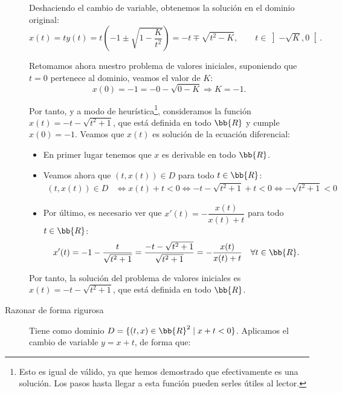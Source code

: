 \documentclass[12pt]{article}
\begin{document}
\begin{ejercicio}
\begin{description}
        Deshaciendo el cambio de variable, obtenemos la solución en el dominio original:
        \begin{equation*}
            x(t)=ty(t)=t\left(-1\pm\sqrt{1-\dfrac{K}{t^2}}\right)=-t\mp\sqrt{t^2-K},\qquad t\in \left]-\sqrt{K},0\right[.
        \end{equation*}

        Retomamos ahora nuestro problema de valores iniciales, suponiendo que $t=0$ pertenece al dominio, veamos el valor de $K$:
        \begin{equation*}
            x(0)=-1=-0-\sqrt{0-K}\Longrightarrow K=-1.
        \end{equation*}
        

        Por tanto, y a modo de heurística\footnote{Esto es igual de válido, ya que hemos demostrado que efectivamente es una solución. Los pasos hasta llegar a esta función pueden serles útiles al lector.}, consideramos la función $x(t)=-t-\sqrt{t^2+1}$, que está definida en todo $\bb{R}$ y cumple $x(0)=-1$. Veamos que $x(t)$ es solución de la ecuación diferencial:
        \begin{itemize}
            \item En primer lugar tenemos que $x$ es derivable en todo $\bb{R}$.
            \item Veamos ahora que $(t,x(t))\in D$ para todo $t\in\bb{R}$:
            \begin{align*}
                (t,x(t))\in D &\Longleftrightarrow x(t)+t<0
                \Longleftrightarrow -t-\sqrt{t^2+1}+t<0
                \Longleftrightarrow -\sqrt{t^2+1}<0
            \end{align*}
            \item Por último, es necesario ver que $x'(t)= -\dfrac{x(t)}{x(t)+t}$ para todo $t\in\bb{R}$:
            \begin{equation*}
                x'(t)=-1-\dfrac{t}{\sqrt{t^2+1}}=\dfrac{-t-\sqrt{t^2+1}}{\sqrt{t^2+1}}=-\dfrac{x(t)}{x(t)+t} \quad \forall t\in\bb{R}.
            \end{equation*}
        \end{itemize}
        Por tanto, la solución del problema de valores iniciales es $x(t)=-t-\sqrt{t^2+1}$, que está definida en todo $\bb{R}$.

        \item[Razonar de forma rigurosa]
        
        Tiene como dominio $D=\{(t,x)\in\bb{R}^2\mid x+t<0\}$. Aplicamos el cambio de variable $y=x+t$, de forma que:


\end{description}
\end{ejercicio}
\end{document}
